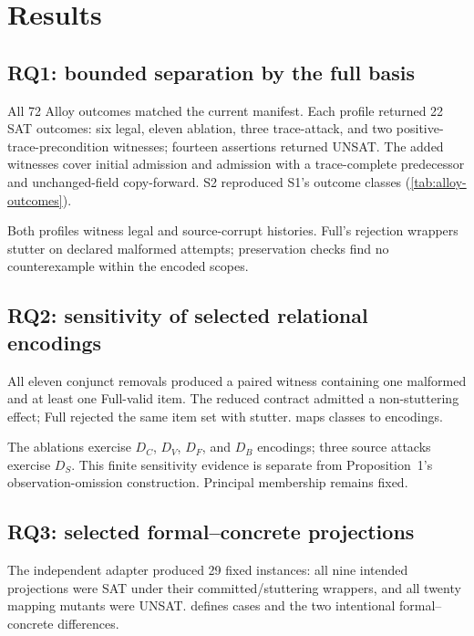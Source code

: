 \section{Results}
\label{sec:results}



\subsection{RQ1: bounded separation by the full basis}

All 72 Alloy outcomes matched the current manifest. Each profile returned 22 SAT outcomes: six legal, eleven ablation, three trace-attack, and two positive-trace-precondition witnesses; fourteen assertions returned UNSAT. The added witnesses cover initial admission and admission with a trace-complete predecessor and unchanged-field copy-forward. S2 reproduced S1's outcome classes (\cref{tab:alloy-outcomes}).

Both profiles witness legal and source-corrupt histories. Full's rejection wrappers stutter on declared malformed attempts; preservation checks find no counterexample within the encoded scopes.

\subsection{RQ2: sensitivity of selected relational encodings}

All eleven conjunct removals produced a paired witness containing one malformed and at least one Full-valid item. The reduced contract admitted a non-stuttering effect; Full rejected the same item set with stutter.  maps classes to encodings.

The ablations exercise $D_C$, $D_V$, $D_F$, and $D_B$ encodings; three source attacks exercise $D_S$. This finite sensitivity evidence is separate from Proposition~1's observation-omission construction. Principal membership remains fixed.

\subsection{RQ3: selected formal--concrete projections}

The independent adapter produced 29 fixed instances: all nine intended projections were SAT under their committed/stuttering wrappers, and all twenty mapping mutants were UNSAT.  defines cases and the two intentional formal--concrete differences.

